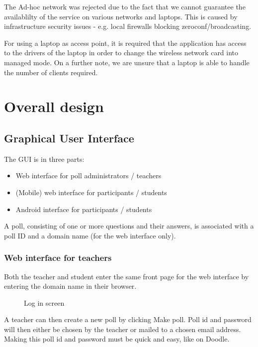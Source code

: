 \documentclass{acm_proc_article-sp}
\begin{document}
The Ad-hoc network was rejected due to the fact that we cannot guarantee the availablilty of the service on various networks and laptops. This is caused by infrastructure security issues - e.g. local firewalls blocking zeroconf/broadcasting.

For using a laptop as access point, it is required that the application has access to the drivers of the laptop in order to change the wireless network card into managed mode. 
On a further note, we are unsure that a laptop is able to handle the number of clients required.




\section{Overall design}

\subsection{Graphical User Interface}
The GUI is in three parts:
\begin{itemize}
  \item Web interface for poll administrators / teachers
  \item (Mobile) web interface for participants / students
  \item Android interface for participants / students
\end{itemize}

A poll, consisting of one or more questions and their answers, is associated with a poll ID and a domain name (for the web interface only).

\subsubsection{Web interface for teachers}
\thispagestyle{fancy}%

Both the teacher and student enter the same front page for the web interface by entering the domain name in their browser.

\begin{figure}[h]
\centering
{}
\caption{Log in screen}
\label{fig:teacher_interface}
\end{figure}

A teacher can then create a new poll by clicking Make poll. Poll id and password will then either be chosen by the teacher or mailed to a chosen email address. Making this poll id and password must be quick and easy, like on Doodle.
\end{document}
